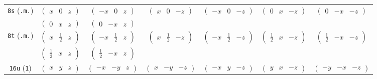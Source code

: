 \documentclass[fleqn,9pt,landscape]{jsarticle}
\begin{document}
\begin{center}
\begin{longtable}{ccccccc}
{\tt 8s} ({\tt .m.}) & $ \begin{pmatrix} x & 0 & z \end{pmatrix} $ & $ \begin{pmatrix} - x & 0 & z \end{pmatrix} $ & $ \begin{pmatrix} x & 0 & - z \end{pmatrix} $ & $ \begin{pmatrix} - x & 0 & - z \end{pmatrix} $ & $ \begin{pmatrix} 0 & x & - z \end{pmatrix} $ & $ \begin{pmatrix} 0 & - x & - z \end{pmatrix} $ \\
& $ \begin{pmatrix} 0 & x & z \end{pmatrix} $ & $ \begin{pmatrix} 0 & - x & z \end{pmatrix} $ & $  $ & $  $ & $  $ & $  $ \\ \hline
{\tt 8t} ({\tt .m.}) & $ \begin{pmatrix} x & \frac{1}{2} & z \end{pmatrix} $ & $ \begin{pmatrix} - x & \frac{1}{2} & z \end{pmatrix} $ & $ \begin{pmatrix} x & \frac{1}{2} & - z \end{pmatrix} $ & $ \begin{pmatrix} - x & \frac{1}{2} & - z \end{pmatrix} $ & $ \begin{pmatrix} \frac{1}{2} & x & - z \end{pmatrix} $ & $ \begin{pmatrix} \frac{1}{2} & - x & - z \end{pmatrix} $ \\
& $ \begin{pmatrix} \frac{1}{2} & x & z \end{pmatrix} $ & $ \begin{pmatrix} \frac{1}{2} & - x & z \end{pmatrix} $ & $  $ & $  $ & $  $ & $  $ \\ \hline
{\tt 16u} ({\tt 1}) & $ \begin{pmatrix} x & y & z \end{pmatrix} $ & $ \begin{pmatrix} - x & - y & z \end{pmatrix} $ & $ \begin{pmatrix} x & - y & - z \end{pmatrix} $ & $ \begin{pmatrix} - x & y & - z \end{pmatrix} $ & $ \begin{pmatrix} y & x & - z \end{pmatrix} $ & $ \begin{pmatrix} - y & - x & - z \end{pmatrix} $ \\

\end{longtable}
\end{center}
\end{document}
